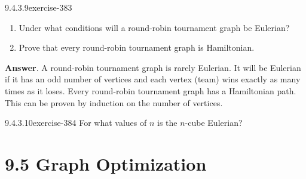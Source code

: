 \documentclass[twoside,10pt,]{book}
\numberwithin{equation}{section}
\begin{document}
\begin{divisionsolution}{9.4.3.9}{}{exercise-383}%
\hypertarget{p-3274}{}%
\leavevmode%
\begin{enumerate}[label=(\alph*)]
\item\hypertarget{li-1547}{}\hypertarget{p-3275}{}%
Under what conditions will a round-robin tournament graph be Eulerian?%
\item\hypertarget{li-1548}{}\hypertarget{p-3276}{}%
Prove that every round-robin tournament graph is Hamiltonian.%
\end{enumerate}
%
\par\smallskip%
\noindent\textbf{Answer}.\quad%
\hypertarget{p-3277}{}%
A round-robin tournament graph is rarely Eulerian. It will be Eulerian if it has an odd number of vertices and each vertex (team) wins exactly as many times as it loses. Every round-robin tournament graph has a Hamiltonian path. This can be proven by induction on the number of vertices.%
\end{divisionsolution}%
\begin{divisionsolution}{9.4.3.10}{}{exercise-384}%
\hypertarget{p-3278}{}%
For what values of \(n\) is the \(n\)-cube Eulerian?%
\end{divisionsolution}%
\section*{9.5 Graph Optimization}
\end{document}
